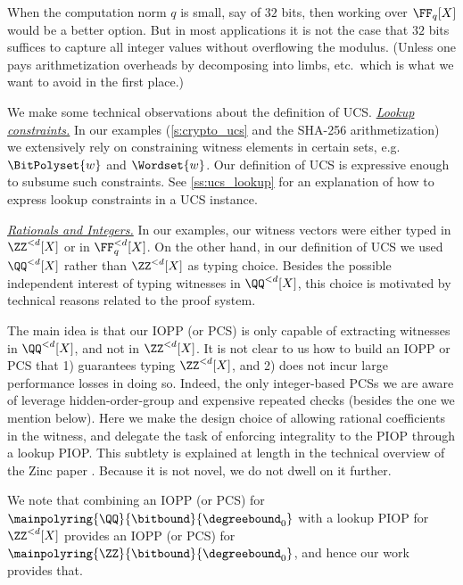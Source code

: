 When the computation norm $q$ is small, say of $32$ bits, then working over $\FF_q[X]$ would be a better option. But in most applications it is not the case that $32$ bits suffices to capture all integer values without overflowing the modulus. (Unless one pays arithmetization overheads by decomposing into limbs, etc.\ which is what we want to avoid in the first place.)

 We make some technical observations about the definition of UCS.
\medskip 
\noindent\emph{\underline{Lookup constraints.}} In our examples (\cref{s:crypto_ucs} and the SHA-256 arithmetization) we extensively rely on constraining witness elements in certain sets, e.g.\ $\BitPolyset{w}$ and $\Wordset{w}$. Our definition of UCS is expressive enough to subsume such constraints. See \cref{ss:ucs_lookup} for an explanation of how to express lookup constraints in a UCS instance.

\noindent\emph{\underline{Rationals and Integers.}} In our examples, our witness vectors were either typed in $\ZZ^{<d}[X]$ or in $\FF_q^{<d}[X]$. On the other hand, in our definition of UCS we used $\QQ^{<d}[X]$ rather than $\ZZ^{<d}[X]$ as typing choice. Besides the possible independent interest of typing witnesses in $\QQ^{<d}[X]$, this choice is motivated by technical reasons related to the proof system.  

The main idea is that our IOPP (or PCS) is only capable of extracting witnesses in $\QQ^{<d}[X]$, and not in $\ZZ^{<d}[X]$. It is not clear to us how to build an IOPP or PCS that 1) guarantees typing $\ZZ^{<d}[X]$, and 2) does not incur large performance losses in doing so. Indeed, the only integer-based PCSs we are aware of \cite{Zartan,BlockDARK} leverage hidden-order-group and expensive repeated checks (besides the one we mention below).  Here we make the design choice of allowing rational coefficients in the witness, and delegate the task of enforcing integrality to the PIOP through a lookup PIOP. This subtlety is explained at length in the technical overview of the Zinc paper \cite{Zinc}. Because it is not novel, we do not dwell on it further. 

We note that combining an IOPP (or PCS) for $\mainpolyring{\QQ}{\bitbound}{\degreebound_0}$ with a lookup PIOP for $\ZZ^{<d}[X]$ provides an IOPP (or PCS) for $\mainpolyring{\ZZ}{\bitbound}{\degreebound_0}$, and hence our work provides that.


\medskip

